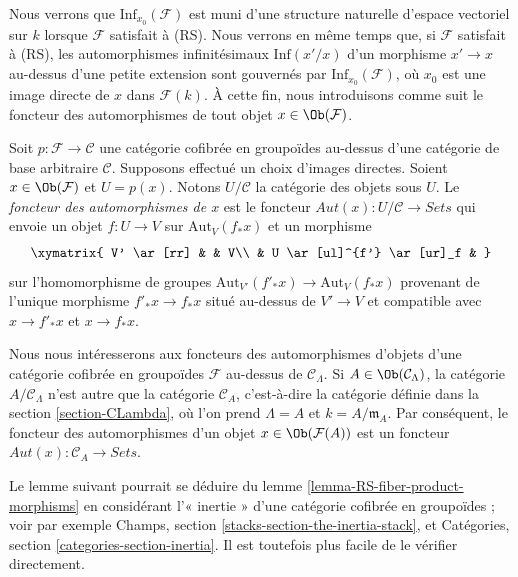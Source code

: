 \noindent
Nous verrons que $\text{Inf}_{x_0}(\mathcal{F})$ est muni d'une structure
naturelle d'espace vectoriel sur $k$ lorsque $\mathcal{F}$ satisfait à (RS).
Nous verrons en même temps que, si $\mathcal{F}$ satisfait à (RS), les
automorphismes infinitésimaux
$\text{Inf}(x'/x)$ d'un morphisme $x' \to x$ au-dessus d'une petite extension
sont gouvernés par $\text{Inf}_{x_0}(\mathcal{F})$, où $x_0$ est une image
directe de $x$ dans $\mathcal{F}(k)$. À cette fin, nous introduisons comme suit
le foncteur des automorphismes de tout objet $x \in \Ob(\mathcal{F})$.

\begin{definition}
\label{definition-automorphism-functor}
Soit $p : \mathcal{F} \to \mathcal{C}$ une catégorie cofibrée en groupoïdes
au-dessus d'une catégorie de base arbitraire $\mathcal{C}$. Supposons effectué
un choix d'images directes. Soient $x \in \Ob(\mathcal{F})$ et $U = p(x)$.
Notons $U/\mathcal{C}$ la catégorie des objets sous $U$. Le {\it foncteur des
automorphismes de $x$} est le foncteur
$\mathit{Aut}(x) : U/\mathcal{C} \to \textit{Sets}$ qui envoie un objet
$f : U \to V$ sur $\text{Aut}_V(f_*x)$ et un morphisme
$$
\xymatrix{
V' \ar[rr] &                    & V\\
          & U \ar[ul]^{f'}  \ar[ur]_f &
}
$$
sur l'homomorphisme de groupes
$\text{Aut}_{V'}(f'_*x) \to \text{Aut}_V(f_*x)$
provenant de l'unique morphisme $f'_*x \to f_*x$ situé au-dessus de
$V' \to V$ et compatible avec $x \to f'_*x$ et $x \to f_*x$.
\end{definition}

\noindent
Nous nous intéresserons aux foncteurs des automorphismes d'objets d'une
catégorie cofibrée en groupoïdes $\mathcal{F}$ au-dessus de
$\mathcal{C}_\Lambda$. Si $A \in \Ob(\mathcal{C}_\Lambda)$, la catégorie
$A/\mathcal{C}_\Lambda$ n'est autre que la catégorie $\mathcal{C}_A$,
c'est-à-dire la catégorie définie dans la section \ref{section-CLambda}, où
l'on prend $\Lambda = A$ et $k = A/\mathfrak m_A$. Par conséquent, le foncteur
des automorphismes d'un objet $x \in \Ob(\mathcal{F}(A))$ est un foncteur
$\mathit{Aut}(x) : \mathcal{C}_A \to \textit{Sets}$.

\medskip\noindent
Le lemme suivant pourrait se déduire du lemme
\ref{lemma-RS-fiber-product-morphisms} en considérant l'« inertie » d'une
catégorie cofibrée en groupoïdes ; voir par exemple Champs, section
\ref{stacks-section-the-inertia-stack}, et Catégories, section
\ref{categories-section-inertia}. Il est toutefois plus facile de le vérifier
directement.


